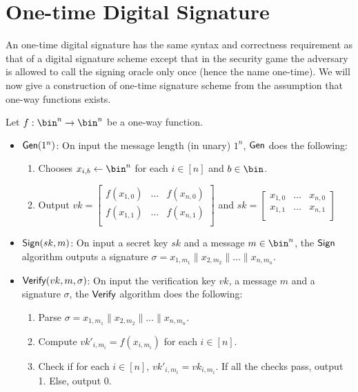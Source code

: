 \documentclass[12pt]{tufte-book}
\begin{document}
\section{One-time Digital Signature}
\label{lampart}
An one-time digital signature has the same syntax and correctness requirement as that of a digital signature scheme except that in the security game the adversary is allowed to call the signing oracle only once (hence the name one-time). We will now give a construction of one-time signature scheme from the assumption that one-way functions exists.

Let $f: \bin^n \rightarrow \bin^n$ be a one-way function.
\begin{itemize}
\item $\mathsf{Gen}(1^n)$: On input the message length (in unary) $1^n$, $\mathsf{Gen}$ does the following:
\begin{enumerate}
    \item Chooses $x_{i,b} \gets \bin^n$ for each $i \in [n]$ and $b \in \bin$.
    \item Output $vk = \left[ \begin{array}{ccc}
f(x_{1,0}) & \ldots & f(x_{n,0}) \\
f(x_{1,1}) & \ldots & f(x_{n,1}) \\
\end{array} \right]$ and $sk = \left[ \begin{array}{ccc}
x_{1,0} & \ldots & x_{n,0} \\
x_{1,1} & \ldots & x_{n,1} \\
\end{array} \right]$
\end{enumerate}
\item $\mathsf{Sign}(sk, m)$: On input a secret key $sk$ and a message $m \in \bin^n$, the $\mathsf{Sign}$ algorithm outputs a signature $\sigma = x_{1,m_1}\|x_{2,m_2}\| \ldots \| x_{n,m_n}$.
\item $\mathsf{Verify}(vk, m, \sigma)$: On input the verification key $vk$, a message $m$ and a signature $\sigma$, the $\mathsf{Verify}$ algorithm does the following:
\begin{enumerate}
    \item Parse $\sigma = x_{1,m_1}\|x_{2,m_2}\| \ldots \| x_{n,m_n}$.
    \item Compute $vk'_{i,m_i} = f(x_{i,m_i})$ for each $i \in [n]$.
    \item Check if for each $i \in [n]$, $vk'_{i,m_i} = vk_{i,m_i}$. If all the checks pass, output 1. Else, output 0.
\end{enumerate}
\end{itemize}
\end{document}
